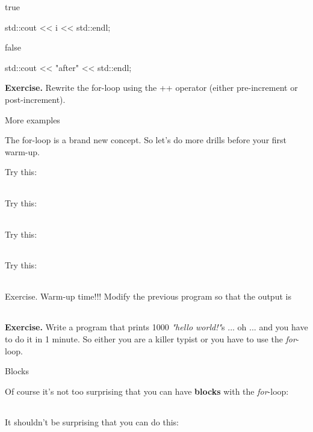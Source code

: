 \documentclass[
]{article}
\begin{document}
true

std::cout \textless\textless{} i \textless\textless{} std::endl;

false

std::cout \textless\textless{} "after" \textless\textless{} std::endl;

\textbf{Exercise.} Rewrite the for-loop using the ++ operator (either
pre-increment or post-increment).

More examples

The for-loop is a brand new concept. So let's do more drills before your
first warm-up.

Try this:

\begin{longtable}[]{@{}@{}}
\toprule
\endhead
\bottomrule
\end{longtable}

Try this:

\begin{longtable}[]{@{}@{}}
\toprule
\endhead
\bottomrule
\end{longtable}

Try this:

\begin{longtable}[]{@{}@{}}
\toprule
\endhead
\bottomrule
\end{longtable}

Try this:

\begin{longtable}[]{@{}@{}}
\toprule
\endhead
\bottomrule
\end{longtable}

Exercise. Warm-up time!!! Modify the previous program so that the output
is

\begin{longtable}[]{@{}@{}}
\toprule
\endhead
\bottomrule
\end{longtable}

\textbf{Exercise.} Write a program that prints 1000 \emph{"hello
world!"}s ... oh ... and you have to do it in 1 minute. So either you
are a killer typist or you have to use the \emph{for}-loop.

Blocks

Of course it's not too surprising that you can have \textbf{blocks} with
the \emph{for}-loop:

\begin{longtable}[]{@{}@{}}
\toprule
\endhead
\bottomrule
\end{longtable}

It shouldn't be surprising that you can do this:
\end{document}
